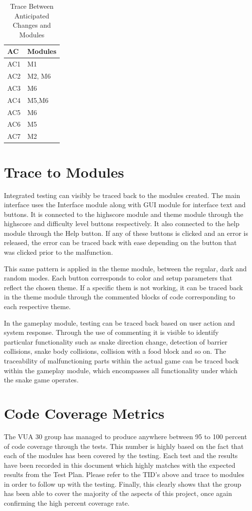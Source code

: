 \documentclass[12pt, titlepage]{article}
\begin{document}
\begin{table}[H]
\centering
\begin{tabular}{p{} p{}}
\toprule
\textbf{AC} & \textbf{Modules}\\
\midrule
AC1 & M1\\
AC2 & M2, M6\\
AC3 & M6\\
AC4 & M5,M6\\
AC5 & M6\\
AC6 & M5\\
AC7 & M2\\
\bottomrule
\end{tabular}
\caption{Trace Between Anticipated Changes and Modules}
\label{TblACT}
\end{table}

\section{Trace to Modules}		
Integrated testing can visibly be traced back to the modules created. The main interface uses the Interface module along with GUI module for interface text and buttons. It is connected to the highscore module and theme module through the highscore and difficulty level buttons respectively. It also connected to the help module through the Help button. If any of these buttons is clicked and an error is released, the error can be traced back with ease depending on the button that was clicked prior to the malfunction.

	This same pattern is applied in the theme module, between the regular, dark and random modes. Each button corresponds to color and setup parameters that reflect the chosen theme. If a specific them is not working, it can be traced back in the theme module through the commented blocks of code corresponding to each respective theme. 

	In the gameplay module, testing can be traced back based on user action and system response. Through the use of commenting it is visible to identify particular functionality such as snake direction change, detection of barrier collisions, snake body collisions, collision with a food block and so on. The traceability of malfunctioning parts within the actual game can be traced back within the gameplay module, which encompasses all functionality under which the snake game operates. 

\section{Code Coverage Metrics}

The VUA 30 group has managed to produce anywhere between 95 to 100 percent of code coverage through the tests. This number is highly based on the fact that each of the modules has been covered by the testing. Each test and the results have been recorded in this document which highly matches with the expected results from the Test Plan.  Please refer to the TID's above and trace to modules in order to follow up with the testing. Finally, this clearly shows that the group has been able to cover the majority of the aspects of this project, once again confirming the high percent coverage rate.


\end{document}
